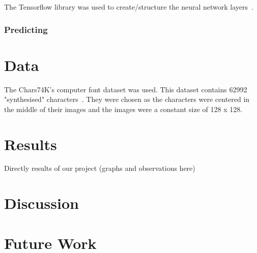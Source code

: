 \documentclass[11pt]{article}
\begin{document}
The Tensorflow library was used to create/structure the neural network layers~\cite{tensorflow15-whitepaper}.

\subsubsection{Predicting}

\section{Data}
The Chars74K's computer font dataset was used. This dataset contains 62992 "synthesised" characters~\cite{deCampos09}. They were chosen as the characters were centered in the middle of their images and the images were a constant size of 128 x 128.

\section{Results}
Directly results of our project (graphs and observations here)

\section{Discussion}


\section{Future Work}

\end{document}
